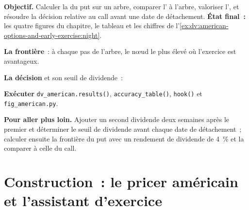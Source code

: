 \begin{tutorial}
\textbf{Objectif.} Calculer la  du put sur un arbre, comparer l'
à l'arbre, valoriser l', et résoudre la décision relative au call
avant une date de détachement. \textbf{État final~:} les quatre figures du chapitre, le tableau et les
chiffres de l'\cref{ex:dv:american-options-and-early-exercise:night}.
\begin{tutsteps}
\item \textbf{La frontière}~: à chaque pas de l'arbre, le nœud le plus élevé où l'exercice
est avantageux.
\label{lst:dv:american-options-and-early-exercise:boundary}
\item \textbf{La décision} et son seuil de dividende~:
\label{lst:dv:american-options-and-early-exercise:decision}
\item \textbf{Exécuter} \texttt{dv\_american.results()}, \texttt{accuracy\_table()},
\texttt{hook()} et \texttt{fig\_american.py}.
\end{tutsteps}
\textbf{Pour aller plus loin.} Ajouter un second dividende deux semaines après le premier et déterminer le
seuil de dividende avant chaque date de détachement~; calculer ensuite la frontière du put avec un
rendement de dividende de 4~\% et la comparer à celle du call.
\end{tutorial}

\section{Construction~: le pricer américain et l'assistant d'exercice}\label{bld:dv:american-options-and-early-exercise:american}

